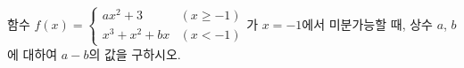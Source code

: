함수 $f(x)=\begin{cases} ax^2+3 & (x\ge -1) \\ x^3+x^2+bx & (x<-1) \end{cases}$가 $x=-1$에서 미분가능할 때, 상수 $a$, $b$에 대하여 $a-b$의 값을 구하시오.

